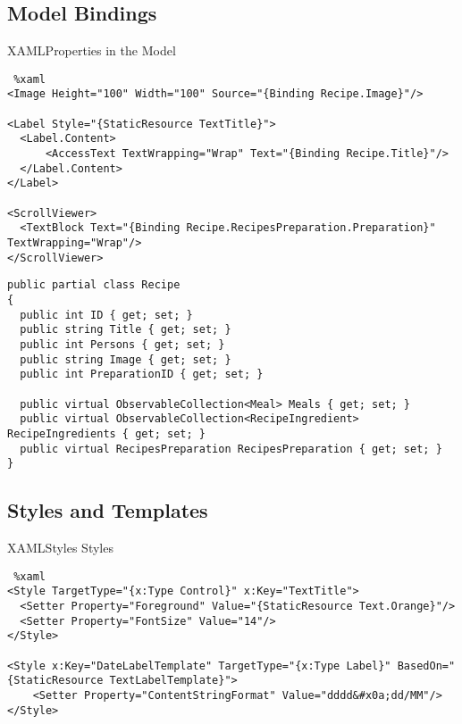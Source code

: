 \subsection{Model Bindings} 
\begin{frame}[fragile]{XAML}{Properties in the Model}

\begin{lstlisting} %xaml
<Image Height="100" Width="100" Source="{Binding Recipe.Image}"/>

<Label Style="{StaticResource TextTitle}">
  <Label.Content>
      <AccessText TextWrapping="Wrap" Text="{Binding Recipe.Title}"/>
  </Label.Content>
</Label>

<ScrollViewer>
  <TextBlock Text="{Binding Recipe.RecipesPreparation.Preparation}" TextWrapping="Wrap"/>
</ScrollViewer>
\end{lstlisting}

\begin{lstlisting}
public partial class Recipe
{
  public int ID { get; set; }
  public string Title { get; set; }
  public int Persons { get; set; }
  public string Image { get; set; }
  public int PreparationID { get; set; }

  public virtual ObservableCollection<Meal> Meals { get; set; }
  public virtual ObservableCollection<RecipeIngredient> RecipeIngredients { get; set; }
  public virtual RecipesPreparation RecipesPreparation { get; set; }
}
\end{lstlisting}

\end{frame}


\subsection{Styles and Templates} 
\begin{frame}[fragile]{XAML}{Styles}
Styles
\begin{lstlisting} %xaml
<Style TargetType="{x:Type Control}" x:Key="TextTitle">
  <Setter Property="Foreground" Value="{StaticResource Text.Orange}"/>
  <Setter Property="FontSize" Value="14"/>
</Style>

<Style x:Key="DateLabelTemplate" TargetType="{x:Type Label}" BasedOn="{StaticResource TextLabelTemplate}">
    <Setter Property="ContentStringFormat" Value="dddd&#x0a;dd/MM"/>
</Style>
\end{lstlisting}

\end{frame}

